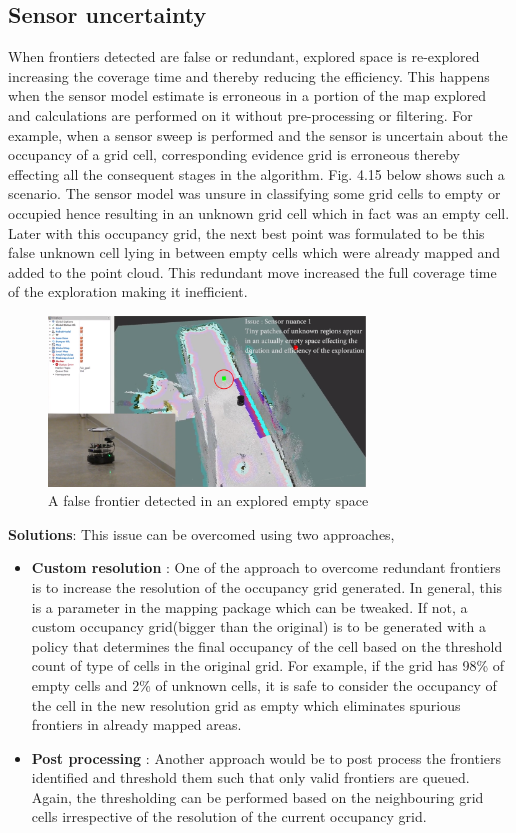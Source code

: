 \subsection{Sensor uncertainty}
When frontiers detected are false or redundant, explored space is re-explored increasing the coverage time  and thereby reducing the efficiency. This happens when the sensor model estimate is erroneous in a portion of the map explored and calculations are performed on it without pre-processing or filtering. For example, when a sensor sweep is performed and the sensor is uncertain about the occupancy of a grid cell, corresponding evidence grid is erroneous thereby effecting all the consequent stages in the algorithm. Fig. 4.15 below shows such a scenario. The sensor model was unsure in classifying some grid cells to empty or occupied hence resulting in an unknown grid cell which in fact was an empty cell. Later with this occupancy grid, the next best point was formulated to be this false unknown cell lying in between empty cells which were already mapped and added to the point cloud. This redundant move increased the full coverage time of the exploration making it inefficient. 

\begin{figure}
    \centering
    \includegraphics[width=0.75\textwidth]{images/falsefrontier.png}
    \caption{A false frontier detected in an explored empty space}
    \label{fig:my_label}
\end{figure}

\textbf{Solutions}: 
This issue can be overcomed using two approaches,
\begin{itemize}
    \item \textbf{Custom resolution} : One of the approach to overcome redundant frontiers is to increase the resolution of the occupancy grid generated. In general, this is a parameter in the mapping package which can be tweaked. If not, a custom occupancy grid(bigger than the original) is to be generated with a policy that determines the final occupancy of the cell based on the threshold count of type of cells in the original grid. For example, if the grid has 98\% of empty cells and 2\% of unknown cells, it is safe to consider the occupancy of the cell in the new resolution grid as empty which eliminates spurious frontiers in already mapped areas.
    \item \textbf{Post processing} : Another approach would be to post process the frontiers identified and threshold them such that only valid frontiers are queued. Again, the thresholding can be performed based on the neighbouring grid cells irrespective of the resolution of the current occupancy grid.  
\end{itemize}

